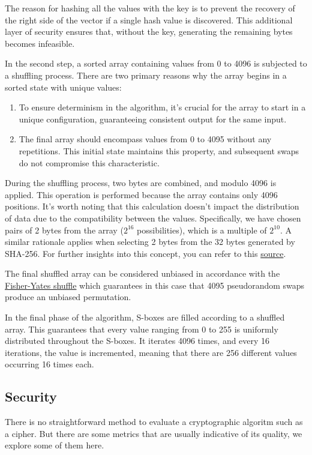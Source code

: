\documentclass{article} %
\begin{document}
The reason for hashing all the values with the key is to prevent the recovery of the right side of the vector if a single hash value is discovered. This additional layer of security ensures that, without the key, generating the remaining bytes becomes infeasible.

In the second step, a sorted array containing values from 0 to 4096 is subjected to a shuffling process. There are two primary reasons why the array begins in a sorted state with unique values:

\begin{enumerate}
\item To ensure determinism in the algorithm, it's crucial for the array to start in a unique configuration, guaranteeing consistent output for the same input.
\item The final array should encompass values from 0 to 4095 without any repetitions. This initial state maintains this property, and subsequent swaps do not compromise this characteristic.
\end{enumerate}

During the shuffling process, two bytes are combined, and modulo 4096 is applied. This operation is performed because the array contains only 4096 positions. It's worth noting that this calculation doesn't impact the distribution of data due to the compatibility between the values. Specifically, we have chosen pairs of 2 bytes from the array ($2^{16}$ possibilities), which is a multiple of $2^{10}$. A similar rationale applies when selecting 2 bytes from the 32 bytes generated by SHA-256. For further insights into this concept, you can refer to this \href{https://crypto.stackexchange.com/a/21010}{source}.

The final shuffled array can be considered unbiased in accordance with the \href{https://en.wikipedia.org/wiki/Fisher%E2%80%93Yates_shuffle}{Fisher-Yates shuffle} which guarantees in this case that 4095 pseudorandom swaps produce an unbiased permutation. 

In the final phase of the algorithm, S-boxes are filled according to a shuffled array. This guarantees that every value ranging from 0 to 255 is uniformly distributed throughout the S-boxes. It iterates 4096 times, and every 16 iterations, the value is incremented, meaning that there are 256 different values occurring 16 times each.


\subsection{Security}
There is no straightforward method to evaluate a cryptographic algoritm such as a cipher. But there are some metrics that are usually indicative of its quality, 
we explore some of them here.
\end{document}
